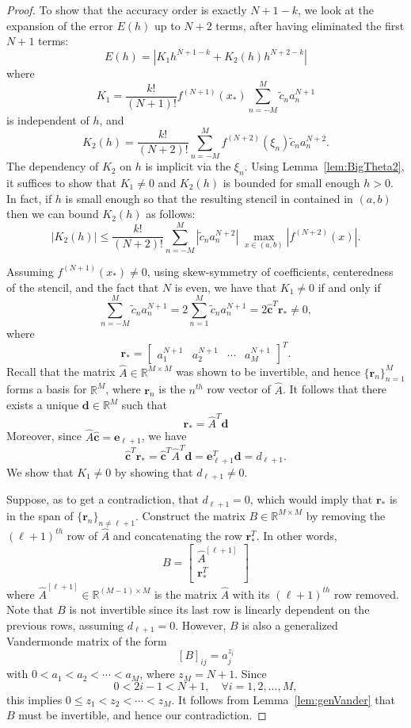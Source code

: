 \documentclass[10pt,a4paper]{amsart}
\newcommand{\R}{\mathbb{R}}
\newcommand{\rstar}{r_*}
\newcommand{\xstar}{x_*}
\begin{document}
\begin{proof}
To show that the accuracy order is exactly $N+1-k$, we look at the expansion of the error $E(h)$ up to $N+2$ terms, after having eliminated the first $N+1$ terms:
\begin{equation*}
    E(h) = \left| K_1h^{N+1-k} + K_2(h)h^{N+2-k} \right|
\end{equation*}
where
\[
	K_1 = \frac{k!}{(N+1)!}f^{(N+1)}(\xstar) \sum_{n=-M}^M \tilde c_n a_n^{N+1}
\]
is independent of $h$, and
\[
	K_2(h) = \frac{k!}{(N+2)!} \sum_{n=-M}^{M} f^{(N+2)}(\xi_n)\tilde c_na_n^{N+2}.
\]
The dependency of $K_2$ on $h$ is implicit via the $\xi_n$.
Using Lemma~\ref{lem:BigTheta2}, it suffices to show that $K_1\neq 0$ and $K_2(h)$ is bounded for small enough $h>0$.
In fact, if $h$ is small enough so that the resulting stencil in contained in $(a,b)$ then we can bound $K_2(h)$ as follows:
\[
	|K_2(h)| \le \frac{k!}{(N+2)!}\sum_{n=-M}^M |\tilde c_na_n^{N+2}| \; \max_{x\in(a,b)}\left|f^{(N+2)}(x)\right|.
\]

Assuming $f^{(N+1)}(\xstar)\neq 0$, using skew-symmetry of coefficients, centeredness of the stencil, and the fact that $N$ is even, we have that $K_1\neq 0$ if and only if
\begin{equation}\label{eq:cr}
    \sum_{n=-M}^M \tilde c_n a_n^{N+1} 
    = 2\sum_{n=1}^M \tilde c_n a_n^{N+1}
    = 2 \hat{\mathbf c}^T \mathbf \rstar
    \neq 0,
\end{equation}
where
\[
	\mathbf \rstar =
	\begin{bmatrix}
	a_1^{N+1} &a_2^{N+1} & \cdots &a_M^{N+1}
	\end{bmatrix}^T.
\] 
Recall that the matrix $\hat A\in\R^{M\times M}$ was shown to be invertible, and hence $\{\mathbf r_n\}_{n=1}^M$ forms a basis for $\R^M$, where $\mathbf r_n$ is the $n^{th}$ row vector of $\hat A$.
It follows that there exists a unique $\mathbf d\in\R^M$ such that
\[
	\mathbf \rstar = \hat A^T\mathbf d
\]
Moreover, since $\hat A\hat{\mathbf c}=\mathbf e_{\ell+1}$, we have
\[
	\hat{\mathbf c}^T\mathbf \rstar = \hat{\mathbf c}^T\hat A^T\mathbf d = \mathbf e_{\ell+1}^T\mathbf d= d_{\ell+1}.
\]
We show that $K_1\neq 0$ by showing that $d_{\ell+1}\neq 0$.

Suppose, as to get a contradiction, that $d_{\ell+1}=0$, which would imply that $\mathbf \rstar$ is in the span of $\{\mathbf r_n\}_{n\neq\ell+1}$.
Construct the matrix $B\in\R^{M\times M}$ by removing the $(\ell+1)^{th}$ row of $\hat A$ and concatenating the row $\mathbf \rstar^T$.
In other words, 
\[
	B = \begin{bmatrix}
		\hat A^{[\ell+1]}\\ \mathbf \rstar^T
	\end{bmatrix}
\]
where $\hat A^{[\ell+1]}\in\R^{(M-1)\times M}$ is the matrix $\hat A$ with its $(\ell+1)^{th}$ row removed.
Note that $B$ is not invertible since its last row is linearly dependent on the previous rows, assuming $d_{\ell+1}=0$.
However, $B$ is also a generalized Vandermonde matrix of the form
\[
	[B]_{ij} = a_j^{z_i}
\]
with $0<a_1<a_2<\cdots < a_M$, where $z_M = N+1$. 
Since
\[
	0<2i-1< N+1, \quad \forall i=1,2,...,M,
\]
this implies $0 \le z_1 < z_2 < \cdots < z_M$.
It follows from Lemma~\ref{lem:genVander} that $B$ must be invertible, and hence our contradiction.
\end{proof}
\end{document}
